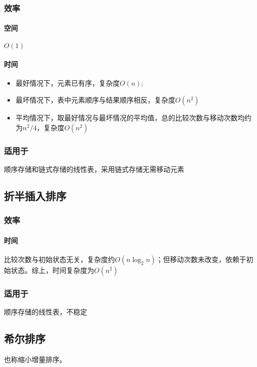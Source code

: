 \subsubsection{效率}

\paragraph{空间}
\(O(1)\)

\paragraph{时间}
\begin{itemize}
    \item 最好情况下，元素已有序，复杂度\(O(n)\);
    \item 最坏情况下，表中元素顺序与结果顺序相反，复杂度\(O(n^2)\)
    \item 平均情况下，取最好情况与最坏情况的平均值，总的比较次数与移动次数均约为\(n^2 / 4\)，复杂度\(O(n^2)\)
\end{itemize}


\subsubsection{适用于}
顺序存储和链式存储的线性表，采用链式存储无需移动元素


\subsection{折半插入排序}

\subsubsection{效率}

\paragraph{时间}
比较次数与初始状态无关，复杂度约\(O(n\log_2n)\)；但移动次数未改变，依赖于初始状态。综上，时间复杂度为\(O(n^2)\)


\subsubsection{适用于}
顺序存储的线性表，不稳定


\subsection{希尔排序}
也称缩小增量排序。

